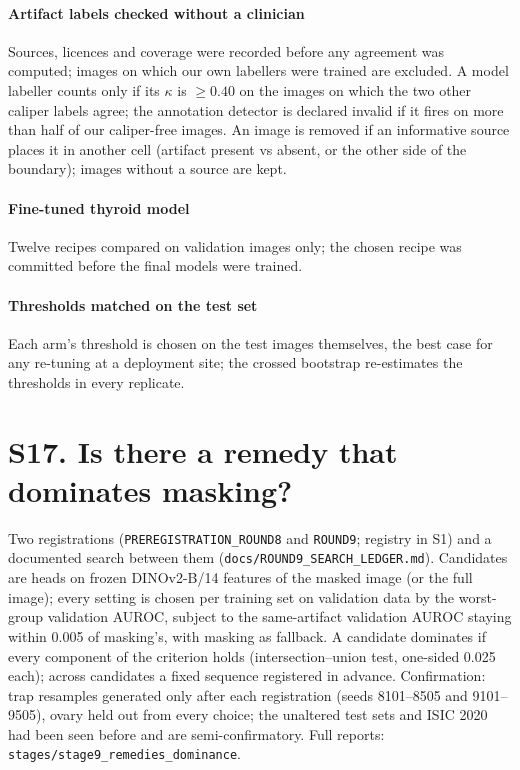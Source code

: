 \documentclass[review,3p]{elsarticle}
\begin{document}
\paragraph{Artifact labels checked without a clinician} Sources, licences and coverage were recorded before any
agreement was computed; images on which our own labellers were trained are excluded. A model labeller counts only if its
$\kappa$ is $\ge0.40$ on the images on which the two other caliper labels agree; the annotation detector is declared
invalid if it fires on more than half of our caliper-free images. An image is removed if an informative source places
it in another cell (artifact present vs absent, or the other side of the boundary); images without a source are kept.





\paragraph{Fine-tuned thyroid model} Twelve recipes compared on validation images only; the chosen recipe was committed
before the final models were trained.



\paragraph{Thresholds matched on the test set} Each arm's threshold is chosen on the test images themselves, the best case
for any re-tuning at a deployment site; the crossed bootstrap re-estimates the thresholds in every replicate.



\section*{S17. Is there a remedy that dominates masking?}\label{supp:S17}
Two registrations (\texttt{PREREGISTRATION\_ROUND8} and \texttt{ROUND9}; registry in S1) and a documented search between
them (\texttt{docs/ROUND9\_SEARCH\_LEDGER.md}). Candidates are heads on frozen DINOv2-B/14 features of the masked image
(or the full image); every setting is chosen per training set on validation data by the worst-group validation AUROC,
subject to the same-artifact validation AUROC staying within 0.005 of masking's, with masking as fallback. A candidate
dominates if every component of the criterion holds (intersection--union test, one-sided 0.025 each); across candidates a
fixed sequence registered in advance. Confirmation: trap resamples generated only after each registration (seeds
8101--8505 and 9101--9505), ovary held out from every choice; the unaltered test sets and ISIC 2020 had been seen before
and are semi-confirmatory. Full reports: \texttt{stages/stage9\_remedies\_dominance}.













\end{document}
